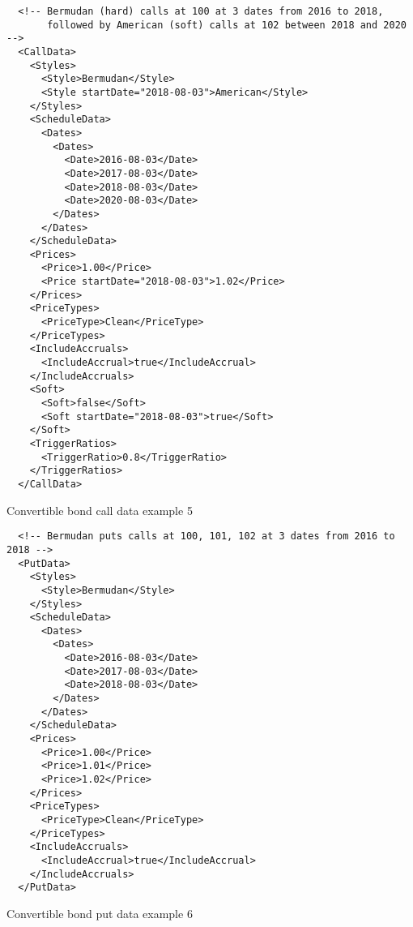 \begin{listing}[H]
\begin{verbatim}
  <!-- Bermudan (hard) calls at 100 at 3 dates from 2016 to 2018,
       followed by American (soft) calls at 102 between 2018 and 2020 -->
  <CallData>
    <Styles>
      <Style>Bermudan</Style>
      <Style startDate="2018-08-03">American</Style>
    </Styles>
    <ScheduleData>
      <Dates>
        <Dates>
          <Date>2016-08-03</Date>
          <Date>2017-08-03</Date>
          <Date>2018-08-03</Date>
          <Date>2020-08-03</Date>
        </Dates>
      </Dates>
    </ScheduleData>
    <Prices>
      <Price>1.00</Price>
      <Price startDate="2018-08-03">1.02</Price>
    </Prices>
    <PriceTypes>
      <PriceType>Clean</PriceType>
    </PriceTypes>
    <IncludeAccruals>
      <IncludeAccrual>true</IncludeAccrual>
    </IncludeAccruals>
    <Soft>
      <Soft>false</Soft>
      <Soft startDate="2018-08-03">true</Soft>
    </Soft>
    <TriggerRatios>
      <TriggerRatio>0.8</TriggerRatio>
    </TriggerRatios>
  </CallData>
\end{verbatim}
\caption{Convertible bond call data example 5}
\label{lst:convertiblebonddata_callputdata_5}
\end{listing}

\begin{listing}[H]
\begin{verbatim}
  <!-- Bermudan puts calls at 100, 101, 102 at 3 dates from 2016 to 2018 -->
  <PutData>
    <Styles>
      <Style>Bermudan</Style>
    </Styles>
    <ScheduleData>
      <Dates>
        <Dates>
          <Date>2016-08-03</Date>
          <Date>2017-08-03</Date>
          <Date>2018-08-03</Date>
        </Dates>
      </Dates>
    </ScheduleData>
    <Prices>
      <Price>1.00</Price>
      <Price>1.01</Price>
      <Price>1.02</Price>
    </Prices>
    <PriceTypes>
      <PriceType>Clean</PriceType>
    </PriceTypes>
    <IncludeAccruals>
      <IncludeAccrual>true</IncludeAccrual>
    </IncludeAccruals>
  </PutData>
\end{verbatim}
\caption{Convertible bond put data example 6}
\label{lst:convertiblebonddata_callputdata_6}
\end{listing}

